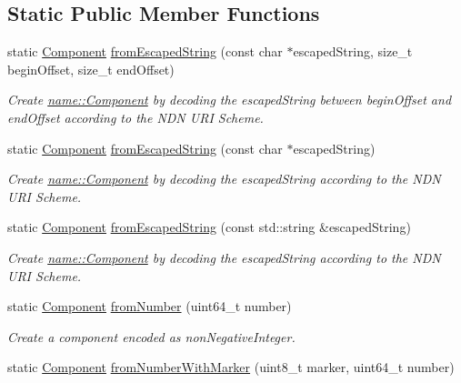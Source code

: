 \subsection*{Static Public Member Functions}
\begin{DoxyCompactItemize}
\item 
static \hyperlink{classndn_1_1name_1_1Component}{Component} \hyperlink{classndn_1_1name_1_1Component_a561266857d8cae243d41d822f1ea4941}{from\+Escaped\+String} (const char $\ast$escaped\+String, size\+\_\+t begin\+Offset, size\+\_\+t end\+Offset)
\begin{DoxyCompactList}\small\item\em Create \hyperlink{classndn_1_1name_1_1Component}{name\+::\+Component} by decoding the escaped\+String between begin\+Offset and end\+Offset according to the N\+DN U\+RI Scheme. \end{DoxyCompactList}\item 
static \hyperlink{classndn_1_1name_1_1Component}{Component} \hyperlink{classndn_1_1name_1_1Component_a557d6d773627e250c8066af0c91358ea}{from\+Escaped\+String} (const char $\ast$escaped\+String)
\begin{DoxyCompactList}\small\item\em Create \hyperlink{classndn_1_1name_1_1Component}{name\+::\+Component} by decoding the escaped\+String according to the N\+DN U\+RI Scheme. \end{DoxyCompactList}\item 
static \hyperlink{classndn_1_1name_1_1Component}{Component} \hyperlink{classndn_1_1name_1_1Component_a00d0e7fa96ea7c6db0663654ad03e6d1}{from\+Escaped\+String} (const std\+::string \&escaped\+String)
\begin{DoxyCompactList}\small\item\em Create \hyperlink{classndn_1_1name_1_1Component}{name\+::\+Component} by decoding the escaped\+String according to the N\+DN U\+RI Scheme. \end{DoxyCompactList}\item 
static \hyperlink{classndn_1_1name_1_1Component}{Component} \hyperlink{classndn_1_1name_1_1Component_a43fb414b1a5c2111eca5637aa66f6fd1}{from\+Number} (uint64\+\_\+t number)
\begin{DoxyCompactList}\small\item\em Create a component encoded as non\+Negative\+Integer. \end{DoxyCompactList}\item 
static \hyperlink{classndn_1_1name_1_1Component}{Component} \hyperlink{classndn_1_1name_1_1Component_ab30d7a4a1a67d4409581f6db9d09a463}{from\+Number\+With\+Marker} (uint8\+\_\+t marker, uint64\+\_\+t number)

\end{DoxyCompactItemize}
